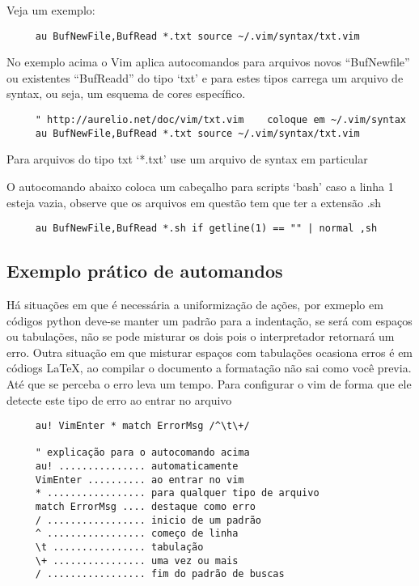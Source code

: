 Veja um exemplo:

\begin{verbatim}
     au BufNewFile,BufRead *.txt source ~/.vim/syntax/txt.vim
\end{verbatim}

No exemplo acima o Vim aplica autocomandos para arquivos novos
``BufNewfile'' ou existentes ``BufReadd'' do tipo `txt' e para estes tipos
carrega um arquivo de syntax, ou seja, um esquema de cores específico.

\begin{verbatim}
     " http://aurelio.net/doc/vim/txt.vim    coloque em ~/.vim/syntax
     au BufNewFile,BufRead *.txt source ~/.vim/syntax/txt.vim
\end{verbatim}

Para arquivos do tipo txt `*.txt' use um arquivo de syntax em particular

O autocomando abaixo coloca um cabeçalho para scripts `bash' caso a
linha 1 esteja vazia, observe que os arquivos em questão tem que ter a
extensão .sh

\begin{verbatim}
     au BufNewFile,BufRead *.sh if getline(1) == "" | normal ,sh
\end{verbatim}

\subsection{Exemplo prático de automandos}
\label{sub:Exemplo prático de automandos}

Há situações em que é necessária a uniformização de ações, por exmeplo em
códigos python deve-se manter um padrão para a indentação, se será com espaços
ou tabulações, não se pode misturar os dois pois o interpretador retornará um erro.
Outra situação em que misturar espaços com tabulações ocasiona erros é em
códiogs \LaTeX, ao compilar o documento a formatação não sai como você previa.
Até que se perceba o erro leva um tempo.  Para configurar o vim de forma que
ele detecte este tipo de erro ao entrar no arquivo

\begin{verbatim}
     au! VimEnter * match ErrorMsg /^\t\+/

     " explicação para o autocomando acima
     au! ............... automaticamente
     VimEnter .......... ao entrar no vim
     * ................. para qualquer tipo de arquivo
     match ErrorMsg .... destaque como erro
     / ................. inicio de um padrão
     ^ ................. começo de linha
     \t ................ tabulação
     \+ ................ uma vez ou mais
     / ................. fim do padrão de buscas
\end{verbatim}


